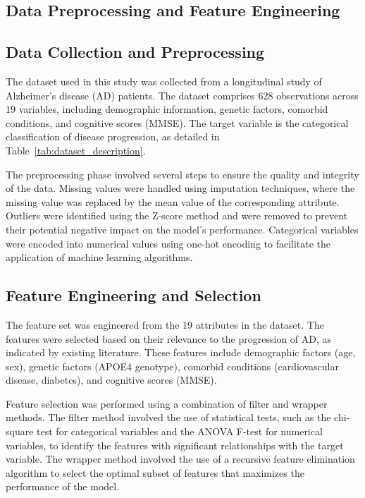 \documentclass[conference]{IEEEtran}
\begin{document}
\subsection{Data Preprocessing and Feature Engineering}
\subsection{Data Collection and Preprocessing}

The dataset used in this study was collected from a longitudinal study of Alzheimer's disease (AD) patients. The dataset comprises 628 observations across 19 variables, including demographic information, genetic factors, comorbid conditions, and cognitive scores (MMSE). The target variable is the categorical classification of disease progression, as detailed in Table~\ref{tab:dataset_description}.

The preprocessing phase involved several steps to ensure the quality and integrity of the data. Missing values were handled using imputation techniques, where the missing value was replaced by the mean value of the corresponding attribute. Outliers were identified using the Z-score method and were removed to prevent their potential negative impact on the model's performance. Categorical variables were encoded into numerical values using one-hot encoding to facilitate the application of machine learning algorithms. 

\subsection{Feature Engineering and Selection}

The feature set was engineered from the 19 attributes in the dataset. The features were selected based on their relevance to the progression of AD, as indicated by existing literature. These features include demographic factors (age, sex), genetic factors (APOE4 genotype), comorbid conditions (cardiovascular disease, diabetes), and cognitive scores (MMSE).

Feature selection was performed using a combination of filter and wrapper methods. The filter method involved the use of statistical tests, such as the chi-square test for categorical variables and the ANOVA F-test for numerical variables, to identify the features with significant relationships with the target variable. The wrapper method involved the use of a recursive feature elimination algorithm to select the optimal subset of features that maximizes the performance of the model.
\end{document}
